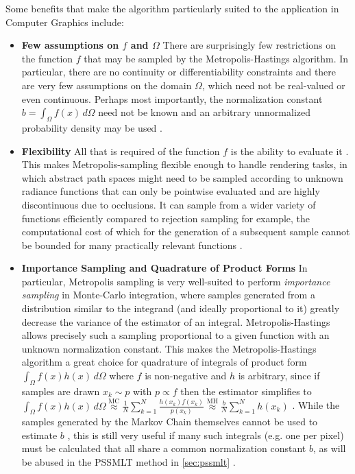 \documentclass[oneside, a4paper]{article}
\begin{document}
Some benefits that make the algorithm particularly suited to the application in Computer Graphics include:
\begin{itemize}
  \item \textbf{Few assumptions on $f$ and $\Omega$} There are surprisingly few restrictions on the function $f$ that may be sampled by the Metropolis-Hastings algorithm. In particular, there are no continuity or differentiability constraints and there are very few assumptions on the domain $\Omega$, which need not be real-valued or even continuous. Perhaps most importantly, the normalization constant $b = \int_{\Omega} f(x)\,d\Omega$ need not be known and an arbitrary unnormalized probability density may be used \autocite{survey}. 
  \item \textbf{Flexibility} All that is required of the function $f$ is the ability to evaluate it \autocite{pbrt}. This makes Metropolis-sampling flexible enough to handle rendering tasks, in which abstract path spaces might need to be sampled according to unknown radiance functions that can only be pointwise evaluated and are highly discontinuous due to occlusions. It can sample from a wider variety of functions efficiently compared to rejection sampling for example, the computational cost of which for the generation of a subsequent sample cannot be bounded for many practically relevant functions \autocite{pbrt}.
  \item \textbf{Importance Sampling and Quadrature of Product Forms} In particular, Metropolis sampling is very well-suited to perform \textit{importance sampling} in Monte-Carlo integration, where samples generated from a distribution similar to the integrand (and ideally proportional to it) greatly decrease the variance of the estimator of an integral. Metropolis-Hastings allows precisely such a sampling proportional to a given function with an unknown normalization constant. This makes the Metropolis-Hastings algorithm a great choice for quadrature of integrals of product form $\int_\Omega f(x)h(x) \,d\Omega$ where $f$ is non-negative and $h$ is arbitrary, since if samples are drawn $x_k \sim p$ with $p\propto f$ then the estimator simplifies to $\int_\Omega f(x)h(x) \,d\Omega \overset{\text{MC}}{\approx} \frac{1}{N}\sum_{k=1}^{N} \frac{h(x_k)f(x_k)}{p(x_k)} \overset{\text{MH}}{\approx} \frac{b}{N} \sum_{k=1}^{N} h(x_k)$ \autocite{survey}. While the samples generated by the Markov Chain themselves cannot be used to estimate $b$ \autocite{survey}, this is still very useful if many such integrals (e.g. one per pixel) must be calculated that all share a common normalization constant $b$, as will be abused in the PSSMLT method in \autoref{sec:pssmlt} \autocite{survey}.

\end{itemize}
\end{document}
